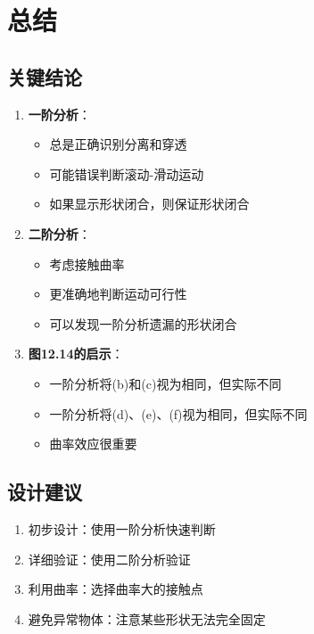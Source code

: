 \documentclass[12pt,a4paper]{article}
\begin{document}
\section{总结}

\subsection{关键结论}

\begin{enumerate}
\item \textbf{一阶分析}：
   \begin{itemize}
   \item 总是正确识别分离和穿透
   \item 可能错误判断滚动-滑动运动
   \item 如果显示形状闭合，则保证形状闭合
   \end{itemize}

\item \textbf{二阶分析}：
   \begin{itemize}
   \item 考虑接触曲率
   \item 更准确地判断运动可行性
   \item 可以发现一阶分析遗漏的形状闭合
   \end{itemize}

\item \textbf{图12.14的启示}：
   \begin{itemize}
   \item 一阶分析将(b)和(c)视为相同，但实际不同
   \item 一阶分析将(d)、(e)、(f)视为相同，但实际不同
   \item 曲率效应很重要
   \end{itemize}
\end{enumerate}

\subsection{设计建议}

\begin{enumerate}
\item 初步设计：使用一阶分析快速判断
\item 详细验证：使用二阶分析验证
\item 利用曲率：选择曲率大的接触点
\item 避免异常物体：注意某些形状无法完全固定
\end{enumerate}
\end{document}
